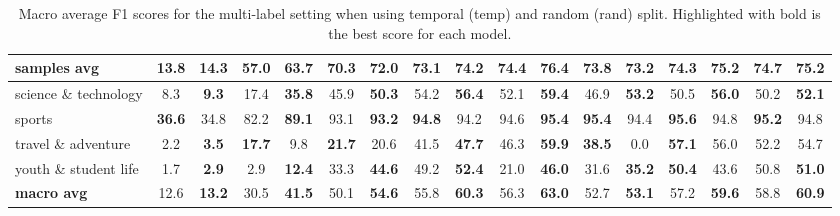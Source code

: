 \begin{table}[t]
{\begin{tabular}{|l|cc|cc|cc|cc|cc|cc|cc|cc|}
samples avg &
  \multicolumn{1}{c|}{13.8} &
  \textbf{14.3} &
  \multicolumn{1}{c|}{57.0} &
  \textbf{63.7} &
  \multicolumn{1}{c|}{\textbf{70.3}} &
  72.0 &
  \multicolumn{1}{c|}{73.1} &
  \textbf{74.2} &
  \multicolumn{1}{c|}{74.4} &
  \textbf{76.4} &
  \multicolumn{1}{c|}{\textbf{73.8}} &
  73.2 &
  \multicolumn{1}{c|}{74.3} &
  \textbf{75.2} &
  \multicolumn{1}{c|}{74.7} &
  \textbf{75.2} \\ \hline
science \& technology &
  \multicolumn{1}{c|}{8.3} &
  \textbf{9.3} &
  \multicolumn{1}{c|}{17.4} &
  \textbf{35.8} &
  \multicolumn{1}{c|}{45.9} &
  \textbf{50.3} &
  \multicolumn{1}{c|}{54.2} &
  \textbf{56.4} &
  \multicolumn{1}{c|}{52.1} &
  \textbf{59.4} &
  \multicolumn{1}{c|}{46.9} &
  \textbf{53.2} &
  \multicolumn{1}{c|}{50.5} &
  \textbf{56.0} &
  \multicolumn{1}{c|}{50.2} &
  \textbf{52.1} \\ \hline
sports &
  \multicolumn{1}{c|}{\textbf{36.6}} &
  34.8 &
  \multicolumn{1}{c|}{82.2} &
  \textbf{89.1} &
  \multicolumn{1}{c|}{93.1} &
  \textbf{93.2} &
  \multicolumn{1}{c|}{\textbf{94.8}} &
  94.2 &
  \multicolumn{1}{c|}{94.6} &
  \textbf{95.4} &
  \multicolumn{1}{c|}{\textbf{95.4}} &
  94.4 &
  \multicolumn{1}{c|}{\textbf{95.6}} &
  94.8 &
  \multicolumn{1}{c|}{\textbf{95.2}} &
  94.8 \\ \hline
travel \& adventure &
  \multicolumn{1}{c|}{2.2} &
  \textbf{3.5} &
  \multicolumn{1}{c|}{\textbf{17.7}} &
  9.8 &
  \multicolumn{1}{c|}{\textbf{21.7}} &
  20.6 &
  \multicolumn{1}{c|}{41.5} &
  \textbf{47.7} &
  \multicolumn{1}{c|}{46.3} &
  \textbf{59.9} &
  \multicolumn{1}{c|}{\textbf{38.5}} &
  0.0 &
  \multicolumn{1}{c|}{\textbf{57.1}} &
  56.0 &
  \multicolumn{1}{c|}{52.2} &
  54.7 \\ \hline
youth \& student life &
  \multicolumn{1}{c|}{1.7} &
  \textbf{2.9} &
  \multicolumn{1}{c|}{2.9} &
  \textbf{12.4} &
  \multicolumn{1}{c|}{33.3} &
  \textbf{44.6} &
  \multicolumn{1}{c|}{49.2} &
  \textbf{52.4} &
  \multicolumn{1}{c|}{21.0} &
  \textbf{46.0} &
  \multicolumn{1}{c|}{31.6} &
  \textbf{35.2} &
  \multicolumn{1}{c|}{\textbf{50.4}} &
  43.6 &
  \multicolumn{1}{c|}{50.8} &
  \textbf{51.0} \\ \hline
\textbf{macro avg} &
  \multicolumn{1}{c|}{12.6} &
  \textbf{13.2} &
  \multicolumn{1}{c|}{30.5} &
  \textbf{41.5} &
  \multicolumn{1}{c|}{50.1} &
  \textbf{54.6} &
  \multicolumn{1}{c|}{55.8} &
  \textbf{60.3} &
  \multicolumn{1}{c|}{56.3} &
  \textbf{63.0} &
  \multicolumn{1}{c|}{52.7} &
  \textbf{53.1} &
  \multicolumn{1}{c|}{57.2} &
  \textbf{59.6} &
  \multicolumn{1}{c|}{58.8} &
  \textbf{60.9} \\ \hline
\end{tabular}}%
\caption{Macro average F1 scores for the multi-label setting when using temporal (temp) and random (rand) split. Highlighted with bold is the best score for each model.}
\label{tab:f1_temporal-random}
\end{table}


